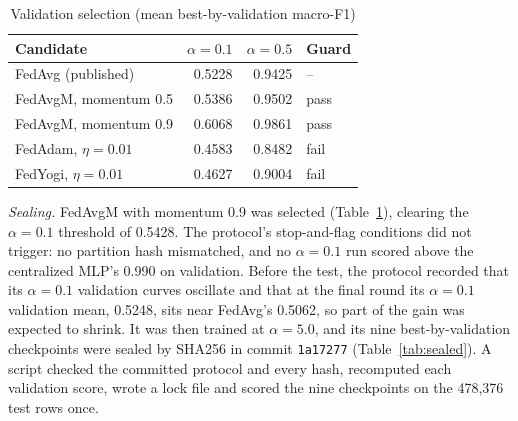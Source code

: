 \begin{table}[h]
\centering
\caption{Validation selection (mean best-by-validation macro-F1)}
\label{tab:prereg_val}
\footnotesize
\begin{tabular}{@{}lrrl@{}}
\toprule
Candidate & $\alpha=0.1$ & $\alpha=0.5$ & Guard\\ %
\midrule
FedAvg (published) & 0.5228 & 0.9425 & --\\ %
FedAvgM, momentum 0.5 & 0.5386 & 0.9502 & pass\\ %
FedAvgM, momentum 0.9 & 0.6068 & 0.9861 & pass\\ %
FedAdam, $\eta=0.01$ & 0.4583 & 0.8482 & fail\\ %
FedYogi, $\eta=0.01$ & 0.4627 & 0.9004 & fail\\ %
\bottomrule
\end{tabular}
\end{table}

\emph{Sealing.} FedAvgM with momentum 0.9 was selected (Table~\ref{tab:prereg_val}), %
clearing the $\alpha=0.1$ threshold of 0.5428. The protocol's stop-and-flag conditions did %
not trigger: no partition hash mismatched, and no $\alpha=0.1$ run scored above the %
centralized MLP's 0.990 on validation. %
Before the test, the protocol recorded that its $\alpha=0.1$ validation curves oscillate %
and that at the final round its $\alpha=0.1$ validation mean, 0.5248, sits near %
FedAvg's 0.5062, so part of the gain was expected to shrink. %
It was then trained at $\alpha=5.0$, %
and its nine best-by-validation checkpoints were sealed by SHA256 in commit
\texttt{1a17277} (Table~\ref{tab:sealed}). A script checked the committed protocol and
every hash, recomputed each validation score, wrote a lock file and scored the nine
checkpoints on the 478,376 test rows once. %


